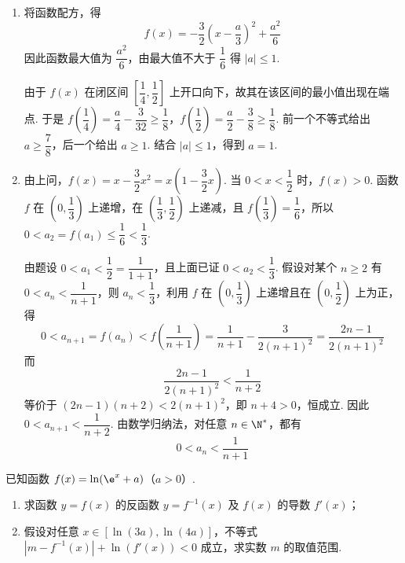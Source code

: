 \begin{solution}
\begin{enumerate}
\item 将函数配方，得
\[
f(x)=-\frac32\left(x-\frac a3\right)^2+\frac{a^2}{6}
\]
因此函数最大值为 \(\dfrac{a^2}{6}\)，由最大值不大于 \(\dfrac16\) 得 \(|a|\leq1\).

由于 \(f(x)\) 在闭区间 \(\left[\dfrac14,\dfrac12\right]\) 上开口向下，故其在该区间的最小值出现在端点. 于是 \(f\left(\dfrac14\right)=\dfrac a4-\dfrac{3}{32}\geq\dfrac18\)，\(f\left(\dfrac12\right)=\dfrac a2-\dfrac38\geq\dfrac18\).
前一个不等式给出 \(a\geq\dfrac78\)，后一个给出 \(a\geq1\). 结合 \(|a|\leq1\)，得到 \(a=1\).

\item 由上问，\(f(x)=x-\dfrac32x^2=x\left(1-\dfrac32x\right)\). 当 \(0<x<\dfrac12\) 时，\(f(x)>0\). 函数 \(f\) 在 \(\left(0,\dfrac13\right)\) 上递增，在 \(\left(\dfrac13,\dfrac12\right)\) 上递减，且
\(f\left(\dfrac13\right)=\dfrac16\)，所以
\(0<a_2=f(a_1)\leq\dfrac16<\dfrac13\).

由题设 \(0<a_1<\dfrac12=\dfrac1{1+1}\)，且上面已证 \(0<a_2<\dfrac13\). 假设对某个 \(n\geq2\) 有 \(0<a_n<\dfrac1{n+1}\)，则 \(a_n<\dfrac13\)，利用 \(f\) 在 \(\left(0,\dfrac13\right)\) 上递增且在 \(\left(0,\dfrac12\right)\) 上为正，得
\[
0<a_{n+1}=f(a_n)<f\left(\frac1{n+1}\right)=\frac1{n+1}-\frac{3}{2(n+1)^2}=\frac{2n-1}{2(n+1)^2}
\]
而
\[
\frac{2n-1}{2(n+1)^2}<\frac1{n+2}
\]
等价于 \((2n-1)(n+2)<2(n+1)^2\)，即 \(n+4>0\)，恒成立. 因此 \(0<a_{n+1}<\dfrac1{n+2}\). 由数学归纳法，对任意 \(n\in\N^*\)，都有
\[
0<a_n<\frac1{n+1}
\]
\end{enumerate}
\end{solution}

\begin{problem}
已知函数 \(f(x) = \ln(\e^x + a)\)（\(a > 0\)）.

\begin{enumerate}
\item 求函数 \(y = f(x)\) 的反函数 \(y = f^{-1}(x)\) 及 \(f(x)\) 的导数 \(f'(x)\)；
\item 假设对任意 \(x \in [\ln(3a), \ln(4a)]\)，不等式 \(|m - f^{-1}(x)| + \ln(f'(x)) < 0\) 成立，求实数 \(m\) 的取值范围.
\end{enumerate}
\end{problem}

